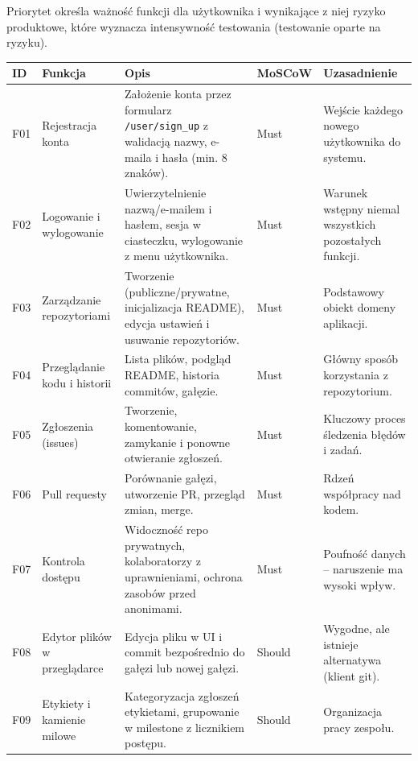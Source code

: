 Priorytet określa ważność funkcji dla użytkownika i wynikające z niej ryzyko produktowe, które wyznacza intensywność testowania (testowanie oparte na ryzyku).

{\small
\begin{longtable}{>{\raggedright\arraybackslash}p{}>{\raggedright\arraybackslash}p{}>{\raggedright\arraybackslash}p{}>{\raggedright\arraybackslash}p{}>{\raggedright\arraybackslash}p{}}
\toprule
\textbf{ID} & \textbf{Funkcja} & \textbf{Opis} & \textbf{MoSCoW} & \textbf{Uzasadnienie} \\
\midrule
\endhead
F01 & Rejestracja konta & Założenie konta przez formularz \texttt{/\allowbreak{}user/\allowbreak{}sign\_\allowbreak{}up} z walidacją nazwy, e-maila i hasła (min. 8 znaków). & Must & Wejście każdego nowego użytkownika do systemu. \\
F02 & Logowanie i wylogowanie & Uwierzytelnienie nazwą/e-mailem i hasłem, sesja w ciasteczku, wylogowanie z menu użytkownika. & Must & Warunek wstępny niemal wszystkich pozostałych funkcji. \\
F03 & Zarządzanie repozytoriami & Tworzenie (publiczne/prywatne, inicjalizacja README), edycja ustawień i usuwanie repozytoriów. & Must & Podstawowy obiekt domeny aplikacji. \\
F04 & Przeglądanie kodu i historii & Lista plików, podgląd README, historia commitów, gałęzie. & Must & Główny sposób korzystania z repozytorium. \\
F05 & Zgłoszenia (issues) & Tworzenie, komentowanie, zamykanie i ponowne otwieranie zgłoszeń. & Must & Kluczowy proces śledzenia błędów i zadań. \\
F06 & Pull requesty & Porównanie gałęzi, utworzenie PR, przegląd zmian, merge. & Must & Rdzeń współpracy nad kodem. \\
F07 & Kontrola dostępu & Widoczność repo prywatnych, kolaboratorzy z uprawnieniami, ochrona zasobów przed anonimami. & Must & Poufność danych – naruszenie ma wysoki wpływ. \\
F08 & Edytor plików w przeglądarce & Edycja pliku w UI i commit bezpośrednio do gałęzi lub nowej gałęzi. & Should & Wygodne, ale istnieje alternatywa (klient git). \\
F09 & Etykiety i kamienie milowe & Kategoryzacja zgłoszeń etykietami, grupowanie w milestone z licznikiem postępu. & Should & Organizacja pracy zespołu. \\

\end{longtable}}
